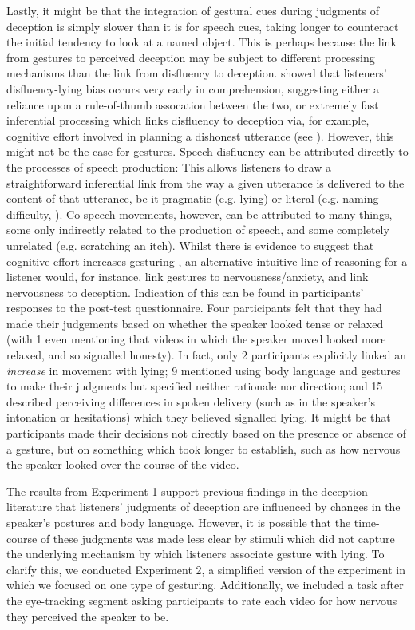 \documentclass[a4paper,man,natbib]{apa6}
\begin{document}
Lastly, it might be that the integration of gestural cues during judgments of deception is simply slower than it is for speech cues, taking longer to counteract the initial tendency to look at a named object. 
This is perhaps because the link from gestures to perceived deception may be subject to different processing mechanisms than the link from disfluency to deception.
\citet{Loy2017} showed that listeners' disfluency-lying bias occurs very early in comprehension, suggesting either a reliance upon a rule-of-thumb assocation between the two, or extremely fast inferential processing which links disfluency to deception via, for example, cognitive effort involved in planning a dishonest utterance (see \citealt{King2018}).
However, this might not be the case for gestures.
Speech disfluency can be attributed directly to the processes of speech production: This allows listeners to draw a straightforward inferential link from the way a given utterance is delivered to the content of that utterance, be it pragmatic (e.g. lying) or literal (e.g. naming difficulty, \citealt[cf.][]{Arnold2007}).
Co-speech movements, however, can be attributed to many things, some only indirectly related to the production of speech, and some completely unrelated (e.g. scratching an itch).
Whilst there is evidence to suggest that cognitive effort increases gesturing \citep{Goldin-Meadow2001}, an alternative intuitive line of reasoning for a listener would, for instance, link gestures to nervousness/anxiety, and link nervousness to deception.
Indication of this can be found in participants' responses to the post-test questionnaire. 
Four participants felt that they had made their judgements based on whether the speaker looked tense or relaxed (with 1 even mentioning that videos in which the speaker moved looked more relaxed, and so signalled honesty).
In fact, only 2 participants explicitly linked an \textit{increase} in movement with lying; 9 mentioned using body language and gestures to make their judgments but specified neither rationale nor direction; and 15 described perceiving differences in spoken delivery (such as in the speaker's intonation or hesitations) which they believed signalled lying. 
It might be that participants made their decisions not directly based on the presence or absence of a gesture, but on something which took longer to establish, such as how nervous the speaker looked over the course of the video.

The results from Experiment 1 support previous findings in the deception literature that listeners' judgments of deception are influenced by changes in the speaker's postures and body language. 
However, it is possible that the time-course of these judgments was made less clear by stimuli which did not capture the underlying mechanism by which listeners associate gesture with lying.
To clarify this, we conducted Experiment 2, a simplified version of the experiment in which we focused on one type of gesturing.
Additionally, we included a task after the eye-tracking segment asking participants to rate each video for how nervous they perceived the speaker to be. 
\end{document}
